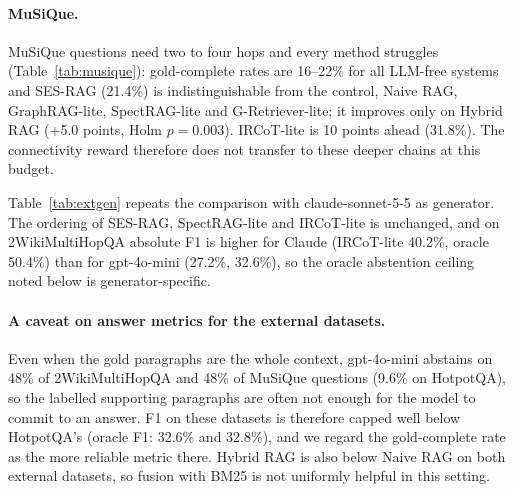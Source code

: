\paragraph{MuSiQue.}
MuSiQue questions need two to four hops and every method struggles (Table~\ref{tab:musique}): gold-complete rates are 16--22\% for all LLM-free systems and SES-RAG (21.4\%) is indistinguishable from the control, Naive RAG, GraphRAG-lite, SpectRAG-lite and G-Retriever-lite; it improves only on Hybrid RAG (+5.0 points, Holm $p=0.003$). IRCoT-lite is 10 points ahead (31.8\%). The connectivity reward therefore does not transfer to these deeper chains at this budget.





Table~\ref{tab:extgen} repeats the comparison with claude-sonnet-5-5 as generator. The ordering of SES-RAG, SpectRAG-lite and IRCoT-lite is unchanged, and on 2WikiMultiHopQA absolute F1 is higher for Claude (IRCoT-lite 40.2\%, oracle 50.4\%) than for gpt-4o-mini (27.2\%, 32.6\%), so the oracle abstention ceiling noted below is generator-specific.

\paragraph{A caveat on answer metrics for the external datasets.} Even when the gold paragraphs are the whole context, gpt-4o-mini abstains on 48\% of 2WikiMultiHopQA and 48\% of MuSiQue questions (9.6\% on HotpotQA), so the labelled supporting paragraphs are often not enough for the model to commit to an answer. F1 on these datasets is therefore capped well below HotpotQA's (oracle F1: 32.6\% and 32.8\%), and we regard the gold-complete rate as the more reliable metric there. Hybrid RAG is also below Naive RAG on both external datasets, so fusion with BM25 is not uniformly helpful in this setting.

